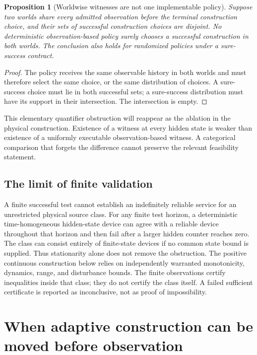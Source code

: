 \documentclass[11pt]{article}
\newtheorem{proposition}[theorem]{Proposition}
\theoremstyle{definition}
\theoremstyle{remark}
\begin{document}
\begin{proposition}[Worldwise witnesses are not one implementable policy]
\label{prop:uniform-choice}
Suppose two worlds share every admitted observation before the terminal
construction choice, and their sets of successful construction choices
are disjoint. No deterministic observation-based policy surely chooses a
successful construction in both worlds. The conclusion also holds for
randomized policies under a sure-success contract.
\end{proposition}
\begin{proof}
The policy receives the same observable history in both worlds and must
therefore select the same choice, or the same distribution of choices.
A sure-success choice must lie in both successful sets; a sure-success
distribution must have its support in their intersection. The
intersection is empty.
\end{proof}
This elementary quantifier obstruction will reappear as the ablation in
the physical construction. Existence of a witness at every hidden state
is weaker than existence of a uniformly executable observation-based
witness. A categorical comparison that forgets the difference cannot
preserve the relevant feasibility statement.

\subsection{The limit of finite validation}
A finite successful test cannot establish an indefinitely reliable
service for an unrestricted physical source class. For any finite test
horizon, a deterministic time-homogeneous hidden-state device can agree
with a reliable device throughout that horizon and then fail after a
larger hidden counter reaches zero. The class can consist entirely of
finite-state devices if no common state bound is supplied. Thus
stationarity alone does not remove the obstruction. The positive
continuous construction below relies on independently warranted
monotonicity, dynamics, range, and disturbance bounds. The finite
observations certify inequalities inside that class; they do not certify
the class itself. A failed sufficient certificate is reported as
inconclusive, not as proof of impossibility.


\section{When adaptive construction can be moved before observation}
\label{arc:sec}
\end{document}
